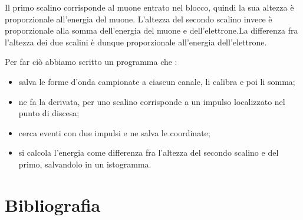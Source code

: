 \documentclass[10pt,a4paper]{article}
\begin{document}
Il primo scalino corrisponde al muone entrato nel blocco, quindi la sua altezza è proporzionale all'energia del muone. L'altezza del secondo scalino invece è proporzionale alla somma dell'energia del muone e dell'elettrone.La differenza fra l'altezza dei due scalini è dunque proporzionale all'energia dell'elettrone. 

Per far ciò abbiamo scritto un programma che :

\begin{itemize}
\item salva le forme d'onda campionate a ciascun canale, li calibra e poi li somma;
\item ne fa la derivata, per uno scalino corrisponde a un impulso localizzato nel punto di discesa;
\item cerca eventi con due impulsi e ne salva le coordinate;
\item si calcola l'energia come differenza fra l'altezza del secondo scalino e del primo, salvandolo in un istogramma.
\end{itemize}


\section{Bibliografia}
\end{document}
